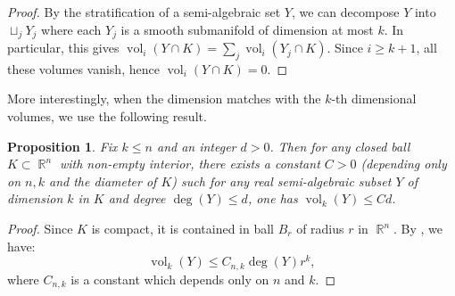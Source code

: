 \documentclass[12pt]{amsbook}%
\newtheorem{prop}[thm]{Proposition}
\theoremstyle{definition}
\theoremstyle{remark}
\numberwithin{section}{chapter}
\numberwithin{subsection}{section}
\numberwithin{figure}{chapter}
\DeclareMathOperator{\C}{\mathbb{C}}
\DeclareMathOperator{\vol}{vol}
\DeclareMathOperator{\R}{\mathbb{R}}
\def\kap{}
\begin{document}
{{\begin{proof}
By the stratification of a semi-algebraic set $Y$, we can decompose $Y$ into $\sqcup_{j} Y_j$ where each $Y_j$ is a smooth submanifold of dimension at most $k$. 
In particular, this gives $\vol_i(Y\cap K) = \sum_{j} \vol_i(Y_j\cap K)$.
 Since $i\geqslant k+1$, all these volumes vanish, hence $\vol_i(Y\cap K) = 0$. 
\end{proof}

More interestingly, when the dimension  matches with the $k$-th dimensional volumes, we use the following result. 

\begin{prop} \label{prop_volume_degree}
Fix $k \leqslant n$ and an integer $d> 0$. Then for any closed ball  $K\subset \R^n$ with non-empty interior, there exists a constant $C> 0$ (depending only on $n,k$ and the diameter of $K$) such for any real semi-algebraic subset  $Y$ of 
dimension $k$ in $K$ and degree $\deg(Y) \leqslant d$, one has $\vol_{k}(Y) \leqslant C d$. 
\end{prop}
\begin{proof}
Since $K$ is compact, it is contained in ball $B_r$ of radius $r$ in $\R^n$. 
By \cite[Corollary 5.2]{yomdin_comte}, we have: 
\begin{equation}
\vol_k(Y) \leqslant C_{n,k} \deg(Y) r^k,  
\end{equation} 
where $C_{n,k}$ is a constant which depends only on $n$ and $k$.
\end{proof}

}}
\end{document}
